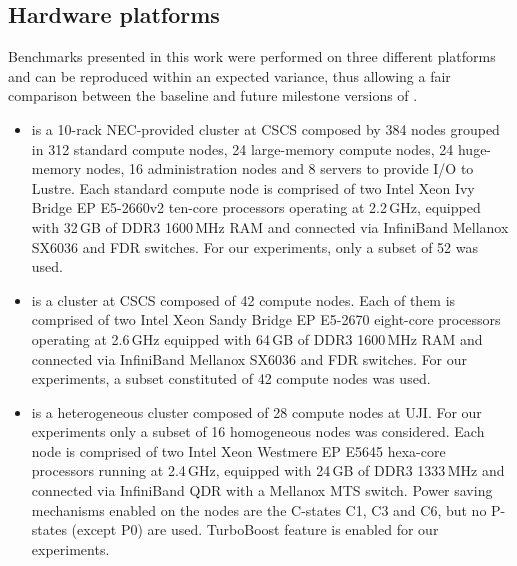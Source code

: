 \subsection{Hardware platforms}
\label{subsec:3.1}

Benchmarks presented  in this work  were performed on  three different
platforms  and can  be reproduced  within an  expected  variance, thus
allowing a  fair comparison between the baseline  and future milestone
versions of \cosmoart.

\begin{itemize}
\item \monch is  a 10-rack NEC-provided clus\-ter at  CSCS composed by
  384   nodes  grouped  in  312  standard  compute  nodes,  24
  large-memory compute nodes,  24 huge-memory nodes, 16 administration
  nodes and 8 servers to provide I/O to Lustre.
Each standard  compute node  is comprised of  two Intel Xeon Ivy Bridge EP
E5-2660v2  ten-core processors  operating at  2.2\,GHz,  equipped with
32\,GB  of DDR3 1600\,MHz  RAM and  connected via  InfiniBand Mellanox
SX6036 and FDR switches.  For our experiments, only a subset of 52 was used. %

\item \pilat is a cluster at CSCS composed of 42 compute nodes.  
  Each of them is comprised of two Intel Xeon Sandy Bridge EP E5-2670 eight-core processors operating
  at 2.6\,GHz equipped with 64\,GB of DDR3 1600\,MHz RAM and connected
  via  InfiniBand   Mellanox  SX6036   and  FDR  switches.    For  our
  experiments, a subset constituted of 42 compute  nodes was used.

\item \tinto is  a heterogeneous cluster composed of  28 compute nodes
  at UJI.  For our experiments only  a subset of  16 homogeneous nodes
  was  considered. Each  node  is  comprised of  two  Intel Xeon Westmere EP E5645
  hexa-core processors  running at  2.4\,GHz, equipped with  24\,GB of
  DDR3  1333\,MHz and  connected via  InfiniBand QDR  with  a Mellanox
  MTS switch. Power saving mechanisms enabled on the nodes are the C-states C1, C3 and C6, 
  but no P-states (except P0) are used. TurboBoost feature is enabled for our experiments.
\end{itemize}

